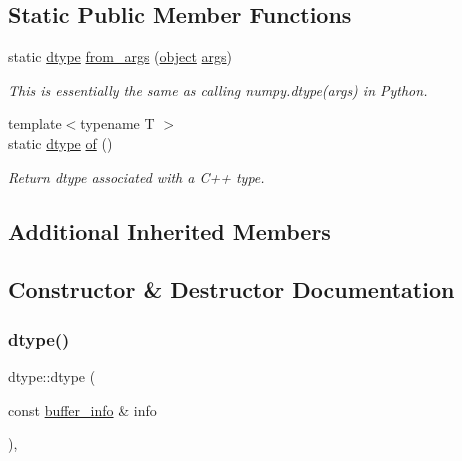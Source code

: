 \subsection*{Static Public Member Functions}
\begin{DoxyCompactItemize}
\item 
static \mbox{\hyperlink{classdtype}{dtype}} \mbox{\hyperlink{classdtype_ac32ee9257455ed7879d124fb225b0baa}{from\+\_\+args}} (\mbox{\hyperlink{classobject}{object}} \mbox{\hyperlink{classargs}{args}})
\begin{DoxyCompactList}\small\item\em This is essentially the same as calling numpy.\+dtype(args) in Python. \end{DoxyCompactList}\item 
{\footnotesize template$<$typename T $>$ }\\static \mbox{\hyperlink{classdtype}{dtype}} \mbox{\hyperlink{classdtype_a06f34b2e5cc8a17f7038e870b9609191}{of}} ()
\begin{DoxyCompactList}\small\item\em Return dtype associated with a C++ type. \end{DoxyCompactList}\end{DoxyCompactItemize}
\subsection*{Additional Inherited Members}


\subsection{Constructor \& Destructor Documentation}
\mbox{\label{classdtype_a1c32bf51931d64aaa4ee0fbf5b50a3be}} 
\subsubsection{\texorpdfstring{dtype()}{dtype()}\hspace{0.1cm}{\footnotesize\ttfamily [1/4]}}
{\footnotesize\ttfamily dtype\+::dtype (\begin{DoxyParamCaption}\item[{const \mbox{\hyperlink{structbuffer__info}{buffer\+\_\+info}} \&}]{info }\end{DoxyParamCaption})\hspace{0.3cm}{\ttfamily [inline]}, {\ttfamily [explicit]}}

